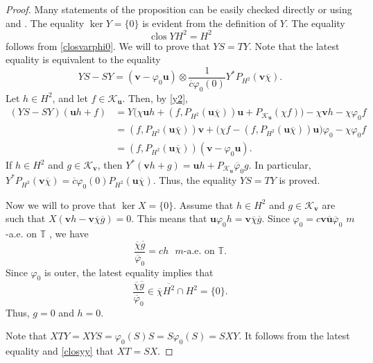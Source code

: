 \documentclass[a4paper,oneside,11pt]{amsart}
\numberwithin{equation}{section}
\theoremstyle{plain}
\theoremstyle{definition}
\begin{document}
\begin{proof} Many statements of the proposition can be easily checked directly or using  \cite{c} and  \cite{fhr}. 
The equality $\ker Y=\{0\}$ is evident from the definition of $Y$. The equality  
\begin{equation}\label{closyy}\operatorname{clos}YH^2=H^2\end{equation} follows from 
\eqref{closvarphi0}.  
We will to  prove that $YS=TY$. Note that the latest equality is equivalent to the equality
$$ YS-SY=({\mathbf v}-\varphi_0{\mathbf u})\otimes\frac{1}{\overline c\varphi_0(0)}Y^*P_{H^2}({\mathbf v}\overline\chi).$$
Let $h\in H^2$, and let $f\in \mathcal K_{\mathbf u}$. Then, by \eqref{y2},  
\begin{equation*}\begin{aligned}
(YS-SY)({\mathbf u}h+f)& =Y\bigl(\chi{\mathbf u}h+(f,P_{H^2}({\mathbf u}\overline\chi)){\mathbf u}+
P_{\mathcal K_{\mathbf u}}(\chi f)\bigr) - \chi{\mathbf v}h-\chi\varphi_0 f \\&
= (f,P_{H^2}({\mathbf u}\overline\chi)){\mathbf v} +\bigl(\chi f-(f,P_{H^2}({\mathbf u}\overline\chi)){\mathbf u}\bigr)\varphi_0-\chi\varphi_0 f\\&
=(f,P_{H^2}({\mathbf u}\overline\chi))({\mathbf v}-\varphi_0 {\mathbf u}).\end{aligned}\end{equation*}
If $h\in H^2$ and $ g\in\mathcal K_{\mathbf v}$, then $Y^*({\mathbf v}h+g)={\mathbf u}h+P_{\mathcal K_{\mathbf u}}\overline\varphi_0 g$. 
In particular, $Y^*P_{H^2}({\mathbf v}\overline\chi)=\overline c\varphi_0(0)P_{H^2}({\mathbf u}\overline\chi)$. Thus, the equality $YS=TY$ is proved. 

Now we  will to prove that $\ker X=\{0\}$. 
Assume that $h\in H^2$ and $g\in\mathcal K_{\mathbf v}$ are such that $X({\mathbf v}h-{\mathbf v}\overline\chi\overline g)=0$. 
This means that 
${\mathbf u}\varphi_0 h={\mathbf v}\overline\chi\overline g$. 
Since $\varphi_0=c{\mathbf v}\overline{\mathbf u}\overline \varphi_0$  $m$-a.e. on $\mathbb T$ , we have 
$$\frac{\overline\chi\overline g}{\overline\varphi_0}= c h\ \  \  m\text{-a.e. on  }\mathbb T.$$
Since $\varphi_0$ is outer, the latest equality implies that 
$$\frac{\overline\chi\overline g}{\overline\varphi_0}\in \overline\chi\overline{H^2}\cap H^2=\{0\}.$$
Thus, $g=0$ and $h=0$.   

Note that $XTY=XYS=\varphi_0(S)S= S\varphi_0(S)=SXY$. It follows from the latest equality and \eqref{closyy} that $XT=SX$.


\end{proof}
\end{document}
